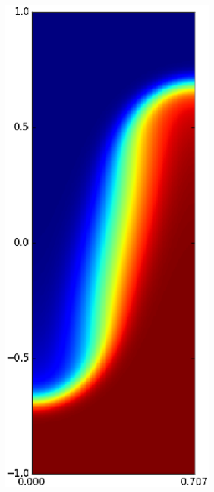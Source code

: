\begin{figure}
\begin{subfigure}[b]{0.24\textwidth}
\includegraphics[width=\textwidth]{gfx/cnv_o16_e32-t_yz-0033}

\end{subfigure}
\end{figure}
